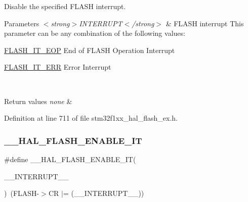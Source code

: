 Disable the specified F\+L\+A\+SH interrupt. 


\begin{DoxyParams}{Parameters}
{\em $<$strong$>$\+I\+N\+T\+E\+R\+R\+U\+P\+T$<$/strong$>$} & F\+L\+A\+SH interrupt This parameter can be any combination of the following values\+: \begin{DoxyItemize}
\item \hyperlink{group___f_l_a_s_h___interrupt__definition_gaea20e80e1806d58a7544cfe8659e7f11}{F\+L\+A\+S\+H\+\_\+\+I\+T\+\_\+\+E\+OP} End of F\+L\+A\+SH Operation Interrupt \item \hyperlink{group___f_l_a_s_h___interrupt__definition_ga4e2c23ab8c1b9a5ee49bf6d695d9ae8c}{F\+L\+A\+S\+H\+\_\+\+I\+T\+\_\+\+E\+RR} Error Interrupt \end{DoxyItemize}
\\
\hline
\end{DoxyParams}

\begin{DoxyRetVals}{Return values}
{\em none} & \\
\hline
\end{DoxyRetVals}


Definition at line 711 of file stm32f1xx\+\_\+hal\+\_\+flash\+\_\+ex.\+h.

\mbox{\label{group___f_l_a_s_h___interrupt_ga13fa137a911f02a2f94fb9fb0762a340}} 
\subsubsection{\texorpdfstring{\+\_\+\+\_\+\+H\+A\+L\+\_\+\+F\+L\+A\+S\+H\+\_\+\+E\+N\+A\+B\+L\+E\+\_\+\+IT}{\_\_HAL\_FLASH\_ENABLE\_IT}}
{\footnotesize\ttfamily \#define \+\_\+\+\_\+\+H\+A\+L\+\_\+\+F\+L\+A\+S\+H\+\_\+\+E\+N\+A\+B\+L\+E\+\_\+\+IT(\begin{DoxyParamCaption}\item[{}]{\+\_\+\+\_\+\+I\+N\+T\+E\+R\+R\+U\+P\+T\+\_\+\+\_\+ }\end{DoxyParamCaption})~(F\+L\+A\+SH-\/$>$CR $\vert$= (\+\_\+\+\_\+\+I\+N\+T\+E\+R\+R\+U\+P\+T\+\_\+\+\_\+))}



